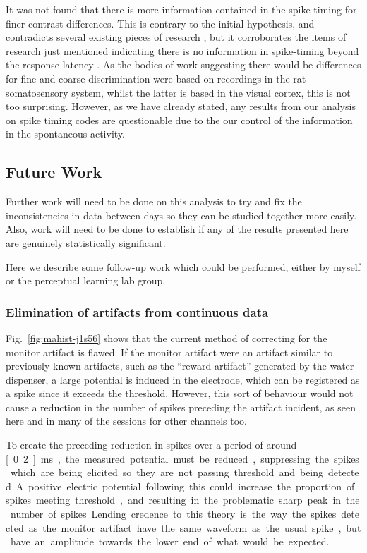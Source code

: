 It was not found that there is more information contained in the spike timing for finer contrast differences.
This is contrary to the initial hypothesis, and contradicts several existing pieces of research \cite{Reich2001,Arabzadeh2006}, but it corroborates the items of research just mentioned indicating there is no information in spike-timing beyond the response latency \cite{Reich2001,Tovee1993,Rolls2011}.
As the bodies of work suggesting there would be differences for fine and coarse discrimination were based on recordings in the rat somatosensory system, whilst the latter is based in the visual cortex, this is not too surprising.
However, as we have already stated, any results from our analysis on spike timing codes are questionable due to the our control of the information in the spontaneous activity.

\subsection{Future Work}

Further work will need to be done on this analysis to try and fix the inconsistencies in data between days so they can be studied together more easily.
Also, work will need to be done to establish if any of the results presented here are genuinely statistically significant.

Here we describe some follow-up work which could be performed, either by myself or the perceptual learning lab group.

\subsubsection{Elimination of artifacts from continuous data}

Fig.~\ref{fig:mahist-j1s56} shows that the current method of correcting for the monitor artifact is flawed.
If the monitor artifact were an artifact similar to previously known artifacts, such as the ``reward artifact'' generated by the water dispenser, a large potential is induced in the electrode, which can be registered as a spike since it exceeds the threshold.
However, this sort of behaviour would not cause a reduction in the number of spikes preceding the artifact incident, as seen here and in many of the sessions for other channels too.

To create the preceding reduction in spikes over a period of around \unit[0.2]{ms}, the measured potential must be reduced, suppressing the spikes which are being elicited so they are not passing threshold and being detected.
A positive electric potential following this could increase the proportion of spikes meeting threshold, and resulting in the problematic sharp peak in the number of spikes.
Lending credence to this theory is the way the spikes detected as the monitor artifact have the same waveform as the usual spike, but have an amplitude towards the lower end of what would be expected.

